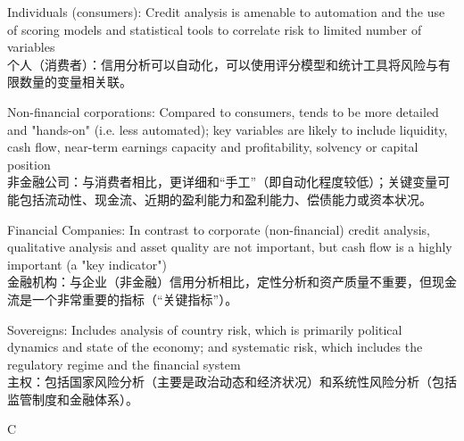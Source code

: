 \documentclass{article}
\begin{document}
\begin{choices}
    \item Individuals (consumers): Credit analysis is amenable to automation and the use of scoring
    models and statistical tools to correlate risk to limited number of variables\\
    个人（消费者）：信用分析可以自动化，可以使用评分模型和统计工具将风险与有限数量的变量相关联。
    \item Non-financial corporations: Compared to consumers, tends to be more detailed and "hands-on"
    (i.e. less automated); key variables are likely to include liquidity, cash flow, near-term
    earnings capacity and profitability, solvency or capital position\\
    非金融公司：与消费者相比，更详细和“手工”（即自动化程度较低）；关键变量可能包括流动性、现金流、近期的盈利能力和盈利能力、偿债能力或资本状况。
    \item Financial Companies: In contrast to corporate (non-financial) credit analysis, qualitative
    analysis and asset quality are not important, but cash flow is a highly important (a "key
    indicator")\\
    金融机构：与企业（非金融）信用分析相比，定性分析和资产质量不重要，但现金流是一个非常重要的指标（“关键指标”）。
    \item Sovereigns: Includes analysis of country risk, which is primarily political dynamics and
    state of the economy; and systematic risk, which includes the regulatory regime and the
    financial system\\
    主权：包括国家风险分析（主要是政治动态和经济状况）和系统性风险分析（包括监管制度和金融体系）。
\end{choices}

\begin{correctanswer}
    C
\end{correctanswer}
\end{document}
